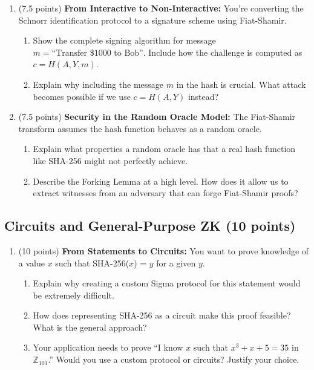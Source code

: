 \documentclass[10pt,a4paper,american]{exam}
\begin{document}
\begin{enumerate}
	\item (7.5 points) \textbf{From Interactive to Non-Interactive:}
	      You're converting the Schnorr identification protocol to a signature scheme using Fiat-Shamir.
	      \begin{enumerate}
		      \item Show the complete signing algorithm for message $m = \text{``Transfer \$1000 to Bob''}$. Include how the challenge is computed as $c = H(A, Y, m)$.
		      \item Explain why including the message $m$ in the hash is crucial. What attack becomes possible if we use $c = H(A, Y)$ instead?
	      \end{enumerate}
	\item (7.5 points) \textbf{Security in the Random Oracle Model:}
	      The Fiat-Shamir transform assumes the hash function behaves as a random oracle.
	      \begin{enumerate}
		      \item Explain what properties a random oracle has that a real hash function like SHA-256 might not perfectly achieve.
		      \item Describe the Forking Lemma at a high level. How does it allow us to extract witnesses from an adversary that can forge Fiat-Shamir proofs?
	      \end{enumerate}
\end{enumerate}

\subsection{Circuits and General-Purpose ZK (10 points)}

\begin{enumerate}
	\item (10 points) \textbf{From Statements to Circuits:}
	      You want to prove knowledge of a value $x$ such that SHA-256($x$) = $y$ for a given $y$.
	      \begin{enumerate}
		      \item Explain why creating a custom Sigma protocol for this statement would be extremely difficult.
		      \item How does representing SHA-256 as a circuit make this proof feasible? What is the general approach?
		      \item Your application needs to prove ``I know $x$ such that $x^3 + x + 5 = 35$ in $\mathbb{Z}_{101}$.'' Would you use a custom protocol or circuits? Justify your choice.
	      \end{enumerate}
\end{enumerate}
\end{document}
